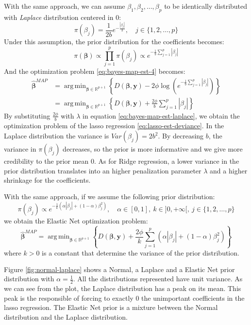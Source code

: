 \documentclass[a4paper, twoside, openright, 12pt]{report}
\DeclareMathOperator*{\argmin}{arg\,min}  %
\theoremstyle{definition}
\theoremstyle{definition}
\theoremstyle{definition}
\theoremstyle{remark}
\begin{document}
With the same approach, we can assume \(\beta_1, \beta_2, \dots, \beta_p\) to be identically distributed with \emph{Laplace} distribution centered in \(0\):
\[
\pi(\beta_j) = \frac{1}{2b}e^{-\frac{|\beta_j|}{b}}, \quad j\in\{1,2,\dots,p\}
\]
Under this assumption, the prior distribution for the coefficients becomes:
\begin{equation}
\label{eq:bayes-glm-prior-laplace}
\pi(\boldsymbol{\beta}) \propto \prod_{j=1}^{p}{\pi(\beta_j)} \propto e^{-\frac{1}{b}{\sum_{j=1}^{p}{|\beta_j|}}} 
\end{equation}
And the optimization problem \eqref{eq:bayes-map-est-4} becomes:
\begin{align}
\nonumber
\hat{\boldsymbol{\beta}}^{MAP} & =
\argmin_{\boldsymbol{\beta}\in\mathbb{R}^{p+1}}{\left\{
D(\boldsymbol{\beta}, \boldsymbol{y}) -2\phi \log{\left(e^{-\frac{1}{b}{\sum_{j=1}^{p}{|\beta_j|}}}\right)} \right\}}  \\
\label{eq:bayes-map-est-laplace}
& = \argmin_{\boldsymbol{\beta}\in\mathbb{R}^{p+1}}{\left\{
D(\boldsymbol{\beta}, \boldsymbol{y}) + \frac{2\phi}{b} {\sum_{j=1}^{p}{|\beta_j|}}\right\}}
\end{align}
By substituting \(\frac{2\phi}{b}\) with \(\lambda\) in equation \eqref{eq:bayes-map-est-laplace}, we obtain the optimization problem of the \ac{lasso} regression \eqref{eq:lasso-est-deviance}. In the Laplace distribution the variance is \(Var(\beta_j) = 2b^2\). By decreasing \(b\), the variance in \(\pi(\beta_j)\) decreases, so the prior is more informative and we give more credibility to the prior mean \(0\). As for Ridge regression, a lower variance in the prior distribution translates into an higher penalization parameter \(\lambda\) and a higher shrinkage for the coefficients.

With the same approach, if we assume the following prior distribution:
\[
\pi(\beta_j) \propto e^{-\frac{1}{k}\left(\alpha|\beta_j| + (1-\alpha)\beta_j^2\right)}, \quad \alpha\in[0,1], \ k\in]0,+\infty[, \ j\in\{1,2,\dots,p\}
\]
we obtain the Elastic Net optimization problem:
\[
\hat{\boldsymbol{\beta}}^{MAP} = \argmin_{\boldsymbol{\beta}\in\mathbb{R}^{p+1}}{\left\{
D(\boldsymbol{\beta}, \boldsymbol{y}) + \frac{2\phi}{k} {\sum_{j=1}^{p}{\left(\alpha|\beta_j| + (1-\alpha)\beta_j^2\right)}}\right\}}
\]
where \(k>0\) is a constant that determine the variance of the prior distribution.

Figure \ref{fig:normal-laplace} shows a Normal, a Laplace and a Elastic Net prior distribution with \(\alpha=\frac{1}{2}\). All the distributions represented have unit variance. As we can see from the plot, the Laplace distribution has a peak on its mean. This peak is the responsible of forcing to exactly \(0\) the unimportant coefficients in the \ac{lasso} regression. The Elastic Net prior is a mixture between the Normal distribution and the Laplace distribution.
\end{document}
